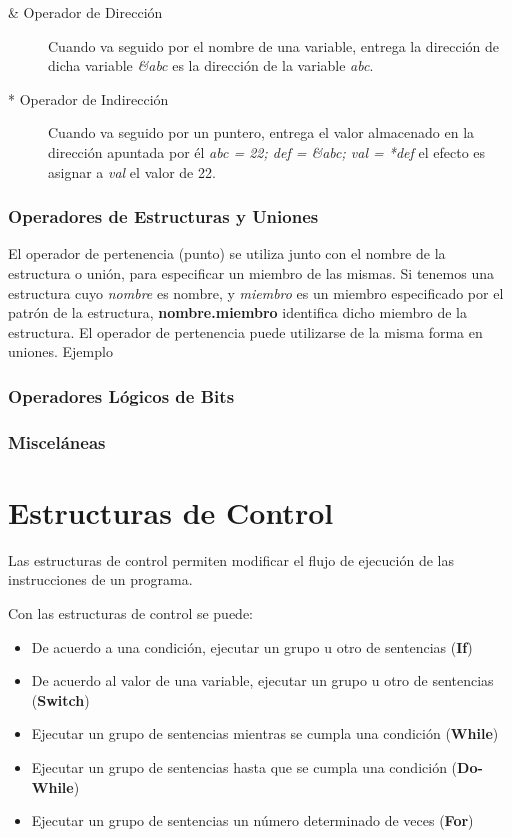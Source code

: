 \begin{description}
\item [\& Operador de Dirección] Cuando va seguido por el nombre de una variable, entrega la dirección de dicha variable \textit{\&abc} es la dirección de la variable \textit{abc}.
\item [* Operador de Indirección] Cuando va seguido por un puntero, entrega el valor almacenado en la dirección apuntada por él \textit{abc = 22; def = \&abc; val = *def} el efecto es asignar a \textit{val} el valor de 22.
\end{description}

\subsubsection{Operadores de Estructuras y Uniones}

El operador de pertenencia (punto) se utiliza junto con el nombre de la estructura o unión, para especificar un miembro de las mismas. Si tenemos una estructura cuyo \textit{nombre} es nombre, y \textit{miembro} es un miembro especificado por el patrón de la estructura, \textbf{nombre.miembro} identifica dicho miembro de la estructura. El operador de pertenencia puede utilizarse de la misma forma en uniones. Ejemplo

\subsubsection{Operadores Lógicos de Bits}
\subsubsection{Misceláneas}







\section{Estructuras de Control}

Las estructuras de control permiten modificar el flujo de ejecución de las instrucciones de un programa.

Con las estructuras de control se puede:

\begin{itemize}
\item De acuerdo a una condición, ejecutar un grupo u otro de sentencias (\textbf{If})
\item De acuerdo al valor de una variable, ejecutar un grupo u otro de sentencias (\textbf{Switch})
\item Ejecutar un grupo de sentencias mientras se cumpla una condición (\textbf{While})
\item Ejecutar un grupo de sentencias hasta que se cumpla una condición (\textbf{Do-While})
\item Ejecutar un grupo de sentencias un número determinado de veces (\textbf{For})
\end{itemize}

